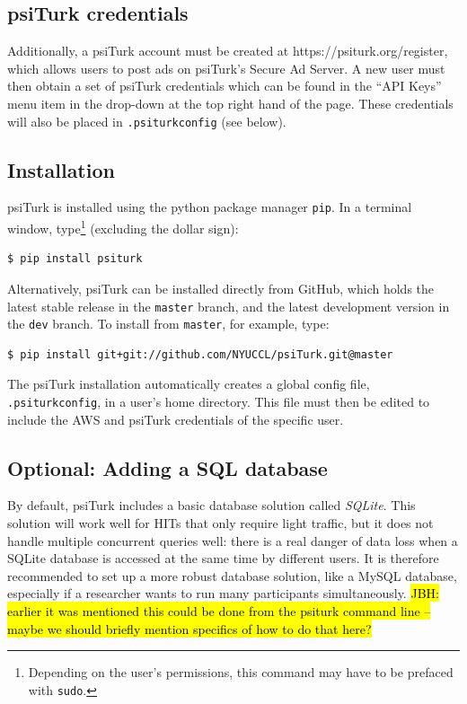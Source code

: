 \documentclass[twocolumn]{svjour3}          %
\newcommand{\psiturk}[0]{\textsf{psiTurk}}
\begin{document}
\subsection{\psiturk{} credentials}
Additionally, a \psiturk{} account must be created at \textsf{https://psiturk.org/register}, which allows users to 
post ads on \psiturk{}'s Secure Ad Server. A new user must then obtain a set of \psiturk{} credentials which can be found in 
the ``API Keys'' menu item in the drop-down at the top right hand of the page.
These credentials will also be placed in \texttt{.psiturkconfig} (see below).

\subsection{Installation}
\psiturk{} is installed using the python package manager \texttt{pip}. In a terminal window, type\footnote{Depending on the user's permissions, this command may have to be prefaced with \texttt{sudo}.} (excluding the dollar sign):

\begin{lstlisting}
$ pip install psiturk
\end{lstlisting}

Alternatively, \psiturk{} can be installed directly from GitHub, which holds the latest stable
release in the \texttt{master} branch, and the latest development version in the \texttt{dev} branch. 
To install from \texttt{master}, for example, type:

\begin{lstlisting}
$ pip install git+git://github.com/NYUCCL/psiTurk.git@master
\end{lstlisting}

The \psiturk{} installation automatically creates a global config file, \texttt{.psiturkconfig}, in a user's home directory. 
This file must then be edited to include the AWS and \psiturk{} credentials of the specific user. 

\subsection{Optional: Adding a SQL database}
By default, \psiturk{} includes a basic database solution called \emph{SQLite}. This solution
will work well for HITs that only require light traffic, but it does not handle
multiple concurrent queries well: there is a real danger of data loss when a SQLite database is accessed at the same time by different users. 
It is therefore recommended to set up a more robust database solution, like a
MySQL database, especially if a researcher wants to run many participants simultaneously.
\hl{JBH: earlier it was mentioned this could be done from the psiturk command line --
maybe we should briefly mention specifics of how to do that here?}
\end{document}
